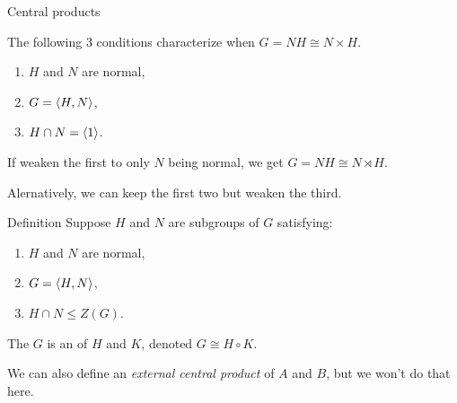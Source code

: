 \documentclass[8pt, handout]{beamer}
\begin{document}
\begin{frame}{Central products}
  
  The following $3$ conditions characterize when $G=NH\cong N\times H$.
  \begin{enumerate}
  \item $H$ and $N$ are normal,
  \item $G=\langle H,N\rangle$,
  \item $H\cap N=\langle1\rangle$.
  \end{enumerate}
  
  \medskip
  
  If weaken the first to only $N$ being normal, we get $G=NH\cong
  N\rtimes H$. \medskip
  
  Alernatively, we can keep the first two but weaken the third. \medskip
  
  \begin{block}{Definition}
    Suppose $H$ and $N$ are subgroups of $G$ satisfying:
    \begin{enumerate}
    \item $H$ and $N$ are normal,
    \item $G=\langle H,N\rangle$,
    \item $H\cap N\leq Z(G)$.
    \end{enumerate}
    The $G$ is an  of $H$ and $K$,
    denoted $G\cong H\circ K$.
  \end{block}
  
  \medskip
  
  We can also define an \emph{external central product} of $A$ and
  $B$, but we won't do that here.
  
\end{frame}

\end{document}
